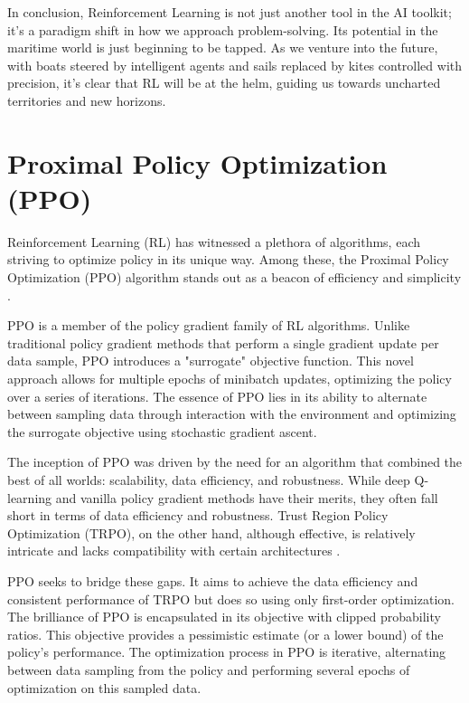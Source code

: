 In conclusion, Reinforcement Learning is not just another tool in the AI toolkit; it's a paradigm shift in how we approach problem-solving. Its potential in the maritime world is just beginning to be tapped. As we venture into the future, with boats steered by intelligent agents and sails replaced by kites controlled with precision, it's clear that RL will be at the helm, guiding us towards uncharted territories and new horizons\cite{mnih2015humanlevel}.


\section{Proximal Policy Optimization (PPO)}\label{sec:ppo_background}

Reinforcement Learning (RL) has witnessed a plethora of algorithms, each striving to optimize policy in its unique way. Among these, the Proximal Policy Optimization (PPO) algorithm stands out as a beacon of efficiency and simplicity \cite{schulman2017ppo}.

PPO is a member of the policy gradient family of RL algorithms. Unlike traditional policy gradient methods that perform a single gradient update per data sample, PPO introduces a "surrogate" objective function. This novel approach allows for multiple epochs of minibatch updates, optimizing the policy over a series of iterations. The essence of PPO lies in its ability to alternate between sampling data through interaction with the environment and optimizing the surrogate objective using stochastic gradient ascent.

The inception of PPO was driven by the need for an algorithm that combined the best of all worlds: scalability, data efficiency, and robustness. While deep Q-learning and vanilla policy gradient methods have their merits, they often fall short in terms of data efficiency and robustness. Trust Region Policy Optimization (TRPO), on the other hand, although effective, is relatively intricate and lacks compatibility with certain architectures \cite{engstrom2020implementation}.

PPO seeks to bridge these gaps. It aims to achieve the data efficiency and consistent performance of TRPO but does so using only first-order optimization. The brilliance of PPO is encapsulated in its objective with clipped probability ratios. This objective provides a pessimistic estimate (or a lower bound) of the policy's performance. The optimization process in PPO is iterative, alternating between data sampling from the policy and performing several epochs of optimization on this sampled data.

